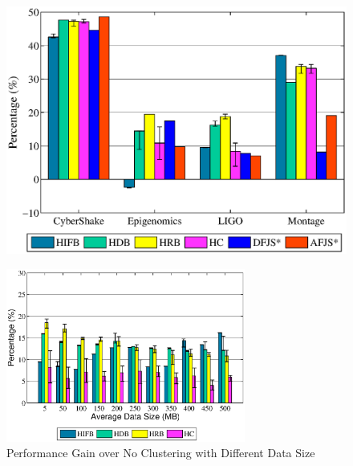\begin{figure}[!htb]
	\centering
	\includegraphics[width=1.0\linewidth]{figures/evaluation/algorithm2.eps}
	\label{fig:evaluation_algorithm}
\end{figure}

\begin{figure}[!htb]
	\centering
    \includegraphics[width=0.7\textwidth]{figures/evaluation/datasize2.eps}
    \caption{Performance Gain over No Clustering with Different Data Size}
    \label{fig:evaluation_datasize}
\end{figure}

